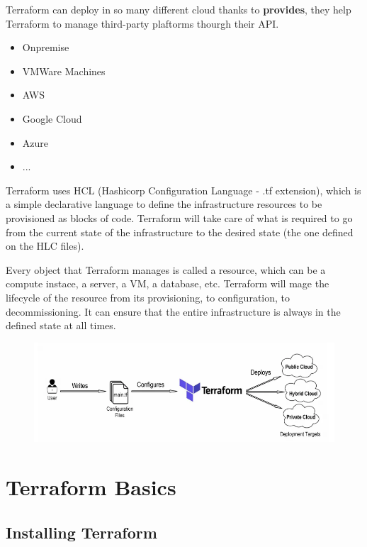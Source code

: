 \documentclass{article}
\begin{document}
Terraform can deploy in so many different cloud thanks to \textbf{provides}, they help Terraform to manage third-party plaftorms thourgh their API.

\begin{itemize}
    \item Onpremise
    \item VMWare Machines
    \item AWS
    \item Google Cloud
    \item Azure
    \item ...
\end{itemize}

Terraform uses HCL (Hashicorp Configuration Language - .tf extension), which is a simple declarative language to define the infrastructure resources to be provisioned as blocks of code. Terraform will take care of what is required to go from the current state of the infrastructure to the desired state (the one defined on the HLC files).

Every object that Terraform manages is called a resource, which can be a compute instace, a server, a VM, a database, etc. Terraform will mage the lifecycle of the resource from its provisioning, to configuration, to decommissioning. It can ensure that the entire infrastructure is always in the defined state at all times.

\begin{figure}[H]
    \includegraphics[width=\textwidth]{pictures/pic1.png}
    \centering
\end{figure}

\newpage
\section{Terraform Basics}

\subsection{Installing Terraform}
\end{document}
